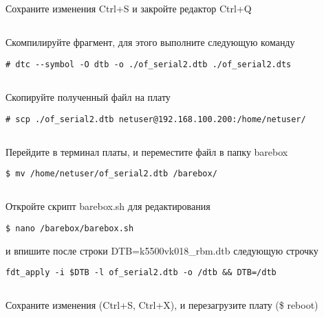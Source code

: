 \subsection{}Сохраните изменения Ctrl+S и закройте редактор Ctrl+Q 

\subsection{}Скомпилируйте фрагмент, для этого выполните следующую команду
\begin{lstlisting}[style=bash]
# dtc --symbol -O dtb -o ./of_serial2.dtb ./of_serial2.dts
\end{lstlisting}

\subsection{}Скопируйте полученный файл на плату
\begin{lstlisting}[style=bash]
# scp ./of_serial2.dtb netuser@192.168.100.200:/home/netuser/
\end{lstlisting}

\subsection{}Перейдите в терминал платы, и переместите файл в папку barebox
\begin{lstlisting}[style=bash]
$ mv /home/netuser/of_serial2.dtb /barebox/
\end{lstlisting}

\subsection{}Откройте скрипт barebox.sh для редактирования
\begin{lstlisting}[style=bash]
$ nano /barebox/barebox.sh
\end{lstlisting}
и впишите после строки DTB=k5500vk018\_rbm.dtb следующую строчку
\begin{lstlisting}[style=stdout]
fdt_apply -i $DTB -l of_serial2.dtb -o /dtb && DTB=/dtb
\end{lstlisting}

\subsection{}Сохраните изменения (Ctrl+S, Ctrl+X), и перезагрузите плату (\$ reboot)

